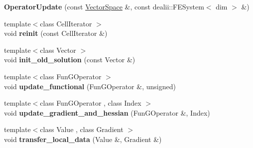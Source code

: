 \begin{DoxyCompactItemize}
\item 
\hypertarget{structSpacy_1_1dealII_1_1Detail_1_1OperatorUpdate_3_01dim_00_01VariableDims_00_01row_00-1_01_4_a74578c1a4703ae9befc3b687779df35a}{{\bfseries \-Operator\-Update} (const \hyperlink{classSpacy_1_1VectorSpace}{\-Vector\-Space} \&, const dealii\-::\-F\-E\-System$<$ dim $>$ \&)}\label{structSpacy_1_1dealII_1_1Detail_1_1OperatorUpdate_3_01dim_00_01VariableDims_00_01row_00-1_01_4_a74578c1a4703ae9befc3b687779df35a}

\item 
\hypertarget{structSpacy_1_1dealII_1_1Detail_1_1OperatorUpdate_3_01dim_00_01VariableDims_00_01row_00-1_01_4_aa6a8e0a8cad820ce4738c2fa23bd782a}{{\footnotesize template$<$class Cell\-Iterator $>$ }\\void {\bfseries reinit} (const \-Cell\-Iterator \&)}\label{structSpacy_1_1dealII_1_1Detail_1_1OperatorUpdate_3_01dim_00_01VariableDims_00_01row_00-1_01_4_aa6a8e0a8cad820ce4738c2fa23bd782a}

\item 
\hypertarget{structSpacy_1_1dealII_1_1Detail_1_1OperatorUpdate_3_01dim_00_01VariableDims_00_01row_00-1_01_4_a4c2b0195981d94e9c2b2c3cf861b71e5}{{\footnotesize template$<$class Vector $>$ }\\void {\bfseries init\-\_\-old\-\_\-solution} (const \-Vector \&)}\label{structSpacy_1_1dealII_1_1Detail_1_1OperatorUpdate_3_01dim_00_01VariableDims_00_01row_00-1_01_4_a4c2b0195981d94e9c2b2c3cf861b71e5}

\item 
\hypertarget{structSpacy_1_1dealII_1_1Detail_1_1OperatorUpdate_3_01dim_00_01VariableDims_00_01row_00-1_01_4_a868cb2004afc7a1a3b18e0417e680f7d}{{\footnotesize template$<$class Fun\-G\-Operator $>$ }\\void {\bfseries update\-\_\-functional} (\-Fun\-G\-Operator \&, unsigned)}\label{structSpacy_1_1dealII_1_1Detail_1_1OperatorUpdate_3_01dim_00_01VariableDims_00_01row_00-1_01_4_a868cb2004afc7a1a3b18e0417e680f7d}

\item 
\hypertarget{structSpacy_1_1dealII_1_1Detail_1_1OperatorUpdate_3_01dim_00_01VariableDims_00_01row_00-1_01_4_a5550959b158d6caa18db1d742d636f43}{{\footnotesize template$<$class Fun\-G\-Operator , class Index $>$ }\\void {\bfseries update\-\_\-gradient\-\_\-and\-\_\-hessian} (\-Fun\-G\-Operator \&, \-Index)}\label{structSpacy_1_1dealII_1_1Detail_1_1OperatorUpdate_3_01dim_00_01VariableDims_00_01row_00-1_01_4_a5550959b158d6caa18db1d742d636f43}

\item 
\hypertarget{structSpacy_1_1dealII_1_1Detail_1_1OperatorUpdate_3_01dim_00_01VariableDims_00_01row_00-1_01_4_afbbe2d5ddfab5df42ddfa42639ee0f9e}{{\footnotesize template$<$class Value , class Gradient $>$ }\\void {\bfseries transfer\-\_\-local\-\_\-data} (\-Value \&, \-Gradient \&)}\label{structSpacy_1_1dealII_1_1Detail_1_1OperatorUpdate_3_01dim_00_01VariableDims_00_01row_00-1_01_4_afbbe2d5ddfab5df42ddfa42639ee0f9e}

\end{DoxyCompactItemize}
